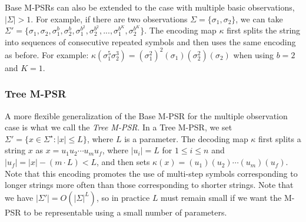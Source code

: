 \documentclass[letterpaper]{article}
\begin{document}



Base M-PSRs can also be extended to the case with multiple basic observations, $|\Sigma| > 1$. For example, if there are two observations $\Sigma = \{\sigma_1, \sigma_2\}$, we can take $\Sigma' = \{\sigma_1,\sigma_2,\sigma_1^b,\sigma_2^{b},\sigma_1^{b^2},\sigma_2^{b^2}, ...,\sigma_1^{b^K},\sigma_2^{b^K}\}$. The encoding map $\kappa$ first splits the string into sequences of consecutive repeated symbols and then uses the same encoding as before. For example: $\kappa(\sigma_1^5 \sigma_2^3)=(\sigma_1^2)^2(\sigma_1)(\sigma_2^2)(\sigma_2)$ when using $b = 2$ and $K = 1$.

\subsubsection{Tree M-PSR}
 
A more flexible generalization of the Base M-PSR for the multiple observation case is what we call the \emph{Tree M-PSR}. In a Tree M-PSR, we set $\Sigma'= \{x \in \Sigma^\star : |x| \leq L\}$, where $L$ is a parameter. The decoding map $\kappa$ first splits a string $x$ as $x=u_1 u_2 \cdots u_m u_f$, where $|u_i| = L$ for $1 \leq i \leq n$ and $|u_f| =|x|-(m \cdot L) < L$, and then sets $\kappa(x) = (u_1)(u_2) \cdots (u_m) (u_f)$. Note that this encoding promotes the use of multi-step symbols corresponding to longer strings more often than those corresponding to shorter strings. Note that we have $|\Sigma'|= O({|\Sigma|}^L)$, so in practice $L$ must remain small if we want the M-PSR to be representable using a small number of parameters. 
\end{document}
